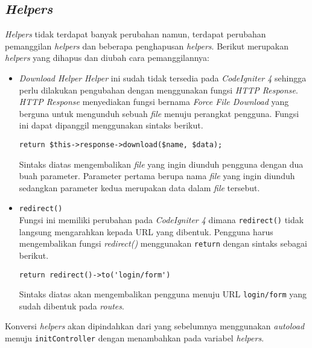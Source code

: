 \subsection{\textit{Helpers}}
\textit{Helpers} tidak terdapat banyak perubahan namun, terdapat perubahan pemanggilan \textit{helpers} dan beberapa penghapusan \textit{helpers}. Berikut merupakan \textit{helpers} yang dihapus dan diubah cara pemanggilannya:
\begin{itemize}
\item \textit{Download Helper}
\textit{Helper} ini sudah tidak tersedia pada \textit{CodeIgniter 4} sehingga perlu dilakukan pengubahan dengan menggunakan fungsi \textit{HTTP Response}. \textit{HTTP Response} menyediakan fungsi bernama \textit{Force File Download} yang berguna untuk mengunduh sebuah \textit{file} menuju perangkat pengguna. Fungsi ini dapat dipanggil menggunakan sintaks berikut.

\begin{center}
 \verb|return $this->response->download($name, $data);|
\end{center}

Sintaks diatas mengembalikan \textit{file} yang ingin diunduh pengguna dengan dua buah parameter. Parameter pertama berupa nama \textit{file} yang ingin diunduh sedangkan parameter kedua merupakan data dalam \textit{file} tersebut.

\item \texttt{redirect()} \\
Fungsi ini memiliki perubahan pada \textit{CodeIgniter 4} dimana \texttt{redirect()} tidak langsung mengarahkan kepada URL yang dibentuk. Pengguna harus mengembalikan fungsi \textit{redirect()} menggunakan \texttt{return} dengan sintaks sebagai berikut.
\begin{center}
 \verb|return redirect()->to('login/form')|
\end{center} 

Sintaks diatas akan mengembalikan pengguna menuju URL \texttt{login/form} yang sudah dibentuk pada \textit{routes}.

\end{itemize}

Konversi \textit{helpers} akan dipindahkan dari yang sebelumnya menggunakan \textit{autoload} menuju \texttt{initController} dengan menambahkan pada variabel \textit{helpers}.
